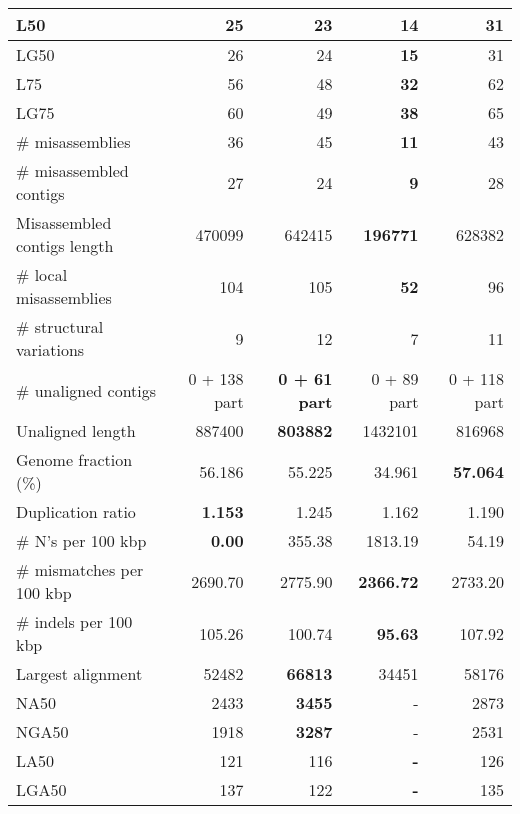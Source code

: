\documentclass[12pt,a4paper]{article}
\begin{document}
\begin{table}[ht]
\begin{center}
\begin{tabular}{|l*{4}{|r}|}
L50 & 25 & 23 & {\bf 14} & 31 \\ \hline
LG50 & 26 & 24 & {\bf 15} & 31 \\ \hline
L75 & 56 & 48 & {\bf 32} & 62 \\ \hline
LG75 & 60 & 49 & {\bf 38} & 65 \\ \hline
\# misassemblies & 36 & 45 & {\bf 11} & 43 \\ \hline
\# misassembled contigs & 27 & 24 & {\bf 9} & 28 \\ \hline
Misassembled contigs length & 470099 & 642415 & {\bf 196771} & 628382 \\ \hline
\# local misassemblies & 104 & 105 & {\bf 52} & 96 \\ \hline
\# structural variations & 9 & 12 & 7 & 11 \\ \hline
\# unaligned contigs & 0 + 138 part & {\bf 0 + 61 part} & 0 + 89 part & 0 + 118 part \\ \hline
Unaligned length & 887400 & {\bf 803882} & 1432101 & 816968 \\ \hline
Genome fraction (\%) & 56.186 & 55.225 & 34.961 & {\bf 57.064} \\ \hline
Duplication ratio & {\bf 1.153} & 1.245 & 1.162 & 1.190 \\ \hline
\# N's per 100 kbp & {\bf 0.00} & 355.38 & 1813.19 & 54.19 \\ \hline
\# mismatches per 100 kbp & 2690.70 & 2775.90 & {\bf 2366.72} & 2733.20 \\ \hline
\# indels per 100 kbp & 105.26 & 100.74 & {\bf 95.63} & 107.92 \\ \hline
Largest alignment & 52482 & {\bf 66813} & 34451 & 58176 \\ \hline
NA50 & 2433 & {\bf 3455} & - & 2873 \\ \hline
NGA50 & 1918 & {\bf 3287} & - & 2531 \\ \hline
LA50 & 121 & 116 & {\bf -} & 126 \\ \hline
LGA50 & 137 & 122 & {\bf -} & 135 \\ \hline
\end{tabular}
\end{center}
\end{table}
\end{document}
